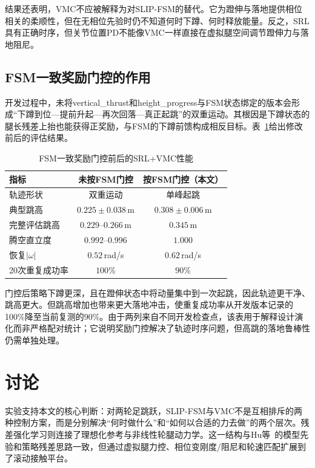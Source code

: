\documentclass[12pt,a4paper,fontset=fandol]{ctexart}
\numberwithin{equation}{section}
\numberwithin{figure}{section}
\numberwithin{table}{section}
\begin{document}
结果还表明，VMC不应被解释为对SLIP-FSM的替代。它为蹬伸与落地提供相位相关的柔顺性，但在无相位先验时仍不知道何时下蹲、何时释放能量。反之，SRL具有正确时序，但关节位置PD不能像VMC一样直接在虚拟腿空间调节蹬伸力与落地阻尼。

\subsection{FSM一致奖励门控的作用}

开发过程中，未将vertical\_thrust和height\_progress与FSM状态绑定的版本会形成“下蹲到位—提前升起—再次回落—真正起跳”的双重运动。其根因是下蹲状态的腿长残差上抬也能获得正奖励，与FSM的下蹲前馈构成相反目标。表~\ref{tab:gating}给出修改前后的评估结果。

\begin{table}[htbp]
    \centering
    \caption{FSM一致奖励门控前后的SRL+VMC性能}
    \label{tab:gating}
    \begin{tabular}{lcc}
        \toprule
        指标 & 未按FSM门控 & 按FSM门控（本文） \\
        \midrule
        轨迹形状 & 双重运动 & 单峰起跳 \\
        典型跳高 & $0.225\pm0.038$\,m & $0.308\pm0.006$\,m \\
        完整评估跳高 & $0.229$--$0.266$\,m & $0.345$\,m \\
        腾空直立度 & $0.992$--$0.996$ & $1.000$ \\
        恢复$|\omega|$ & $0.52$\,rad/s & $0.62$\,rad/s \\
        20次重复成功率 & $100\%$ & $90\%$ \\
        \bottomrule
    \end{tabular}
\end{table}

门控后策略下蹲更深，且在蹬伸状态中将动量集中到一次起跳，因此轨迹更干净、跳高更大。但跳高增加也带来更大落地冲击，使重复成功率从开发版本记录的100\%降至当前复测的90\%。由于两列来自不同开发检查点，该表用于解释设计演化而非严格配对统计；它说明奖励门控解决了轨迹时序问题，但高跳的落地鲁棒性仍需单独处理。

\section{讨论}

实验支持本文的核心判断：对两轮足跳跃，SLIP-FSM与VMC不是互相排斥的两种控制方案，而是分别解决“何时做什么”和“如何以合适的力去做”的两个层次。残差强化学习则连接了理想化参考与非线性轮腿动力学。这一结构与Hu等~\cite{hu2026srl}的模型先验和策略残差思路一致，但通过虚拟腿力控、相位变刚度/阻尼和轮速匹配扩展到了滚动接触平台。
\end{document}
